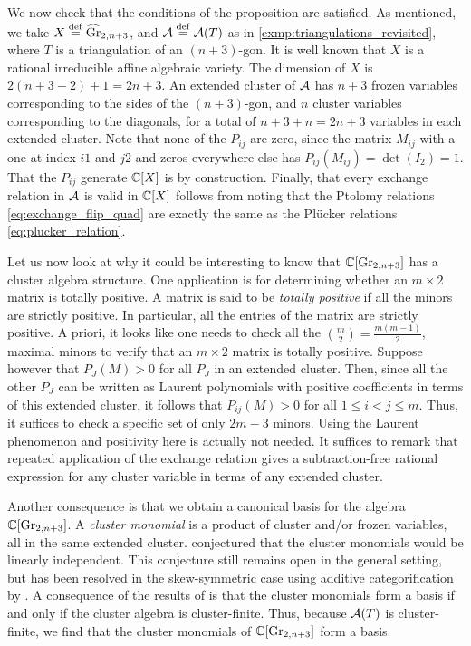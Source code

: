 We now check that the conditions of the proposition are satisfied. As mentioned, we
take $X \overset{\mathrm{def}}{=} \widehat{\operatorname{Gr}}_{2, n+3}$, and $\mathcal{A} \overset{\mathrm{def}}{=} \mathcal{A}(T)$ as in
\cref{exmp:triangulations_revisited}, where $T$ is a triangulation of an $(n+3)$-gon.
It is well known \cite[Proposition 12.7]{FominZelevinsky2003CAFin} that $X$ is a
rational irreducible affine algebraic variety. The dimension of $X$ is $2 (n+3 - 2) + 1
	= 2n +3$. An extended cluster of $\mathcal{A}$ has $n+3$ frozen variables corresponding to the
sides of the $(n+3)$-gon, and $n$ cluster variables corresponding to the diagonals, for
a total of $n+3 + n = 2n +3$ variables in each extended cluster. Note that none of the
$P_{ij}$ are zero, since the matrix $M_{ij}$ with a one at index $i1$ and $j2$ and
zeros everywhere else has $P_{ij}(M_{ij}) = \det(I_2) = 1$. That the $P_{ij}$ generate
$\mathbb{C}[X]$ is by construction. Finally, that every exchange relation in $\mathcal{A}$ is valid
in $\mathbb{C}[X]$ follows from noting that the Ptolomy relations
\cref{eq:exchange_flip_quad} are exactly the same as the Plücker relations
\cref{eq:plucker_relation}.

\medskip

Let us now look at why it could be interesting to know that $\mathbb{C}[\operatorname{Gr}_{2, n+3}]$ has a
cluster algebra structure. One application is for determining whether an $m \times 2$
matrix is totally positive. A matrix is said to be \emph{totally
	positive} if all the minors are strictly positive. In
particular, all the entries of the matrix are strictly positive. A priori, it looks
like one needs to check all the $\binom{m}{2} = \frac{m(m-1)}{2}$, maximal minors to
verify that an $m \times 2$ matrix is totally positive. Suppose however that $P_J(M) >
	0$ for all $P_J$ in an extended cluster. Then, since all the other $P_J$ can be written
as Laurent polynomials with positive coefficients in terms of this extended cluster, it
follows that $P_{ij}(M) > 0$ for all $1 \leq i < j \leq m$. Thus, it suffices to check
a specific set of only $2m - 3$ minors. Using the Laurent phenomenon and positivity
here is actually not needed. It suffices to remark that repeated application of the
exchange relation gives a subtraction-free rational expression for any cluster variable
in terms of any extended cluster.

Another consequence is that we obtain a canonical basis for the algebra $\mathbb{C}[\operatorname{Gr}_{2,
			n+3}]$. A \emph{cluster monomial} is a product of cluster
and/or frozen variables, all in the same extended cluster.
\Textcite{FominZelevinsky2002CAF} conjectured that the cluster monomials would be
linearly independent. This conjecture still remains open in the general setting, but
has been resolved in the skew-symmetric case using additive categorification by
\textcite{CerulliKeller2013LinearIndependenceCMSSCA}. A consequence of the results of
\textcite{GrossHackingKeelKontsevich2018CanonicalBCA} is that the cluster monomials
form a basis if and only if the cluster algebra is cluster-finite. Thus, because
$\mathcal{A}(T)$ is cluster-finite, we find that the cluster monomials of $\mathbb{C}[\operatorname{Gr}_{2, n+3}]$
form a basis.

